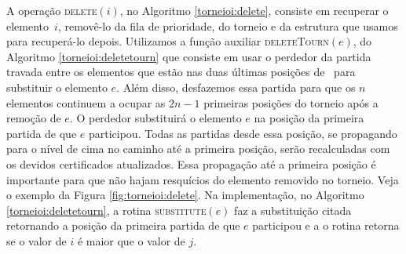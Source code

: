 





A operação \textsc{delete}$(i)$, no Algoritmo \ref{torneioi:delete},
consiste em recuperar o elemento~$i$, removê-lo da fila de
prioridade, do torneio e da estrutura que usamos para recuperá-lo
depois. Utilizamos a função auxiliar \textsc{deleteTourn}$(e)$, do
Algoritmo \ref{torneioi:deletetourn} que consiste em usar o perdedor
da partida travada entre os elementos que estão nas duas últimas
posições de \torneio~para substituir o elemento $e$. Além disso,
desfazemos essa partida para que os $n$ elementos continuem a ocupar
as $2n - 1$ primeiras posições do torneio após a remoção de $e$. O
perdedor substituirá o elemento $e$ na posição da primeira partida
de que $e$ participou. Todas as partidas desde essa posição, se
propagando para o nível de cima no caminho até a primeira posição,
serão recalculadas com os devidos certificados atualizados. Essa
propagação até a primeira posição é importante para que não hajam
resquícios do elemento removido no torneio. Veja o exemplo da Figura
\ref{fig:torneioi:delete}. Na implementação, no Algoritmo
\ref{torneioi:deletetourn}, a rotina \textsc{substitute}$(e)$ faz a
substituição citada retornando a posição da primeira partida de que
$e$ participou e a o rotina  retorna se o
valor de $i$ é maior que o valor de $j$.






